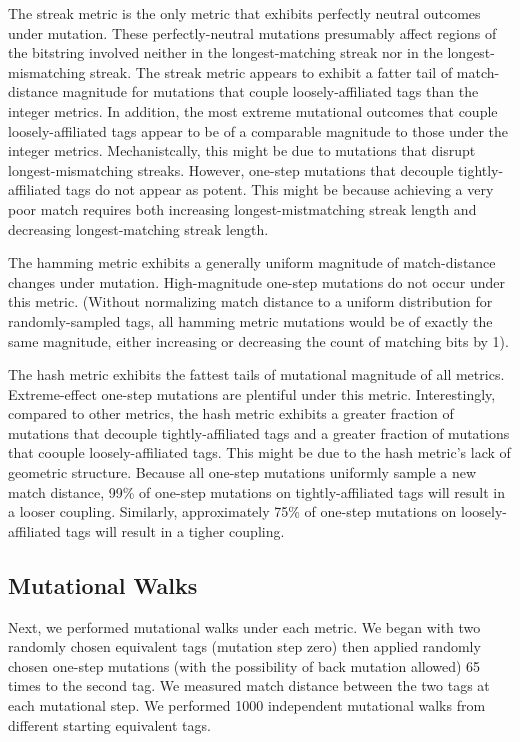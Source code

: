 The streak metric is the only metric that exhibits perfectly neutral outcomes under mutation.
These perfectly-neutral mutations presumably affect regions of the bitstring involved neither in the longest-matching streak nor in the longest-mismatching streak.
The streak metric appears to exhibit a fatter tail of match-distance magnitude for mutations that couple loosely-affiliated tags than the integer metrics.
In addition, the most extreme mutational outcomes that couple loosely-affiliated tags appear to be of a comparable magnitude to those under the integer metrics.
Mechanistcally, this might be due to mutations that disrupt longest-mismatching streaks.
However, one-step mutations that decouple tightly-affiliated tags do not appear as potent.
This might be because achieving a very poor match requires both increasing longest-mistmatching streak length and decreasing longest-matching streak length.

The hamming metric exhibits a generally uniform magnitude of match-distance changes under mutation.
High-magnitude one-step mutations do not occur under this metric.
(Without normalizing match distance to a uniform distribution for randomly-sampled tags, all hamming metric mutations would be of exactly the same magnitude, either increasing or decreasing the count of matching bits by 1).

The hash metric exhibits the fattest tails of mutational magnitude of all metrics.
Extreme-effect one-step mutations are plentiful under this metric.
Interestingly, compared to other metrics, the hash metric exhibits a greater fraction of mutations that decouple tightly-affiliated tags and a greater fraction of mutations that coouple loosely-affiliated tags.
This might be due to the hash metric's lack of geometric structure.
Because all one-step mutations uniformly sample a new match distance, 99\% of one-step mutations on tightly-affiliated tags will result in a looser coupling.
Similarly, approximately 75\% of one-step mutations on loosely-affiliated tags will result in a tigher coupling.

\subsection{Mutational Walks}




Next, we performed mutational walks under each metric.
We began with two randomly chosen equivalent tags (mutation step zero) then applied randomly chosen one-step mutations (with the possibility of back mutation allowed) 65 times to the second tag.
We measured match distance between the two tags at each mutational step.
We performed 1000 independent mutational walks from different starting equivalent tags.

